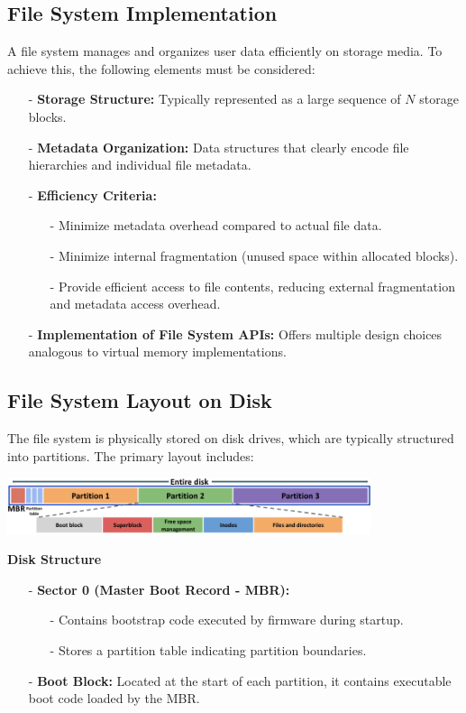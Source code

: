 \subsection{File System Implementation}
A file system manages and organizes user data efficiently on storage media. To achieve this, the following elements must be considered:

\begin{itemize}[itemsep=2pt, topsep=1pt]
    \item[-] \textbf{Storage Structure:} Typically represented as a large sequence of $N$ storage blocks.
    \item[-] \textbf{Metadata Organization:} Data structures that clearly encode file hierarchies and individual file metadata.
    \item[-] \textbf{Efficiency Criteria:}
    \begin{itemize}
        \item[-] Minimize metadata overhead compared to actual file data.
        \item[-] Minimize internal fragmentation (unused space within allocated blocks).
        \item[-] Provide efficient access to file contents, reducing external fragmentation and metadata access overhead.
    \end{itemize}
    \item[-] \textbf{Implementation of File System APIs:} Offers multiple design choices analogous to virtual memory implementations.
\end{itemize}

\subsection{File System Layout on Disk}

The file system is physically stored on disk drives, which are typically structured into partitions. The primary layout includes:
\begin{center}
  \includegraphics[width=0.8\textwidth]{chapters/L6/images/fs-layout-ondisk.png}
\end{center}


\textbf{Disk Structure}\\
\begin{itemize}[itemsep=2pt, topsep=1pt]
    \item[-] \textbf{Sector 0 (Master Boot Record - MBR):}
\begin{itemize}[itemsep=2pt, topsep=1pt]
        \item[-] Contains bootstrap code executed by firmware during startup.
        \item[-] Stores a partition table indicating partition boundaries.
    \end{itemize}
    \item[-] \textbf{Boot Block:} Located at the start of each partition, it contains executable boot code loaded by the MBR.
\end{itemize}

